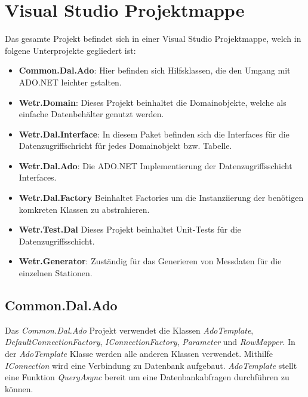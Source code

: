 \section{Visual Studio Projektmappe}

Das gesamte Projekt befindet sich in einer Visual Studio Projektmappe, welch in folgene Unterprojekte gegliedert ist:
\begin{itemize}
    \item \textbf{Common.Dal.Ado}: Hier befinden sich Hilfsklassen, die den Umgang mit ADO.NET leichter gstalten.
    \item \textbf{Wetr.Domain}: Dieses Projekt beinhaltet die Domainobjekte, welche als einfache Datenbehälter genutzt werden.
    \item \textbf{Wetr.Dal.Interface}: In diesem Paket befinden sich die Interfaces für die Datenzugriffschricht für jedes Domainobjekt bzw. Tabelle.
    \item \textbf{Wetr.Dal.Ado}: Die ADO.NET Implementierung der Datenzugriffsschicht Interfaces.
    \item \textbf{Wetr.Dal.Factory} Beinhaltet Factories um die Instanziierung der benötigen komkreten Klassen zu abstrahieren.
    \item \textbf{Wetr.Test.Dal} Dieses Projekt beinhaltet Unit-Tests für die Datenzugriffsschicht.
    \item \textbf{Wetr.Generator}: Zuständig für das Generieren von Messdaten für die einzelnen Stationen.
\end{itemize}

\newpage
\subsection{Common.Dal.Ado}
Das \textit{Common.Dal.Ado} Projekt verwendet die Klassen \textit{AdoTemplate}, \textit{DefaultConnectionFactory}, \textit{IConnectionFactory}, \textit{Parameter} und  \textit{RowMapper}. In der  \textit{AdoTemplate} Klasse werden alle anderen Klassen verwendet. Mithilfe  \textit{IConnection} wird eine Verbindung zu Datenbank aufgebaut.  \textit{AdoTemplate} stellt eine Funktion  \textit{QueryAsync} bereit um eine Datenbankabfragen durchführen zu können.

